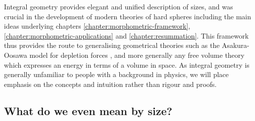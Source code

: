 Integral geometry provides elegant and unified description of sizes, and was crucial in the development of modern theories of hard spheres including the main ideas underlying chapters \ref{chapter:morphometric-framework}, \ref{chapter:morphometric-applications} and \ref{chapter:resummation}.
This framework thus provides the route to generalising geometrical theories such as the Asakura-Oosawa model for depletion forces \cite{AsakuraJCP1954,AsakuraJPS1958}, and more generally any free volume theory which expresses an energy in terms of a volume in space.
As integral geometry is generally unfamiliar to people with a background in physics, we will place emphasis on the concepts and intuition rather than rigour and proofs.

\subsection{What do we even mean by size?}
\label{sec:what-is-size}

